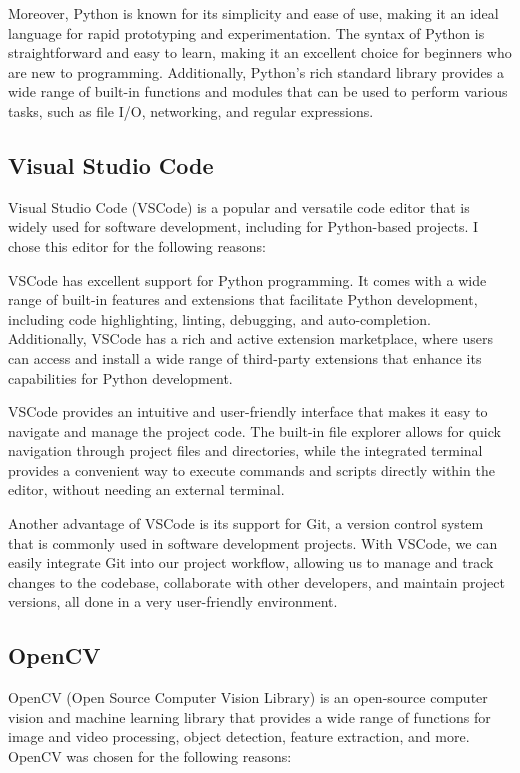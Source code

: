 \documentclass[final,rdr32.tex]{subfiles}
\begin{document}
Moreover, Python is known for its simplicity and ease of use, making it an ideal language for rapid prototyping and experimentation. The syntax of Python is straightforward and easy to learn, making it an excellent choice for beginners who are new to programming. Additionally, Python's rich standard library provides a wide range of built-in functions and modules that can be used to perform various tasks, such as file I/O, networking, and regular expressions.


\subsection{Visual Studio Code}

Visual Studio Code (VSCode) is a popular and versatile code editor that is widely used for software development, including for Python-based projects. I chose this editor for the following reasons:

VSCode has excellent support for Python programming. It comes with a wide range of built-in features and extensions that facilitate Python development, including code highlighting, linting, debugging, and auto-completion. Additionally, VSCode has a rich and active extension marketplace, where users can access and install a wide range of third-party extensions that enhance its capabilities for Python development.

VSCode provides an intuitive and user-friendly interface that makes it easy to navigate and manage the project code. The built-in file explorer allows for quick navigation through project files and directories, while the integrated terminal provides a convenient way to execute commands and scripts directly within the editor, without needing an external terminal.

Another advantage of VSCode is its support for Git, a version control system that is commonly used in software development projects. With VSCode, we can easily integrate Git into our project workflow, allowing us to manage and track changes to the codebase, collaborate with other developers, and maintain project versions, all done in a very user-friendly environment.

\subsection{OpenCV}

OpenCV (Open Source Computer Vision Library) is an open-source computer vision and machine learning library that provides a wide range of functions for image and video processing, object detection, feature extraction, and more. OpenCV was chosen for the following reasons:
\end{document}
